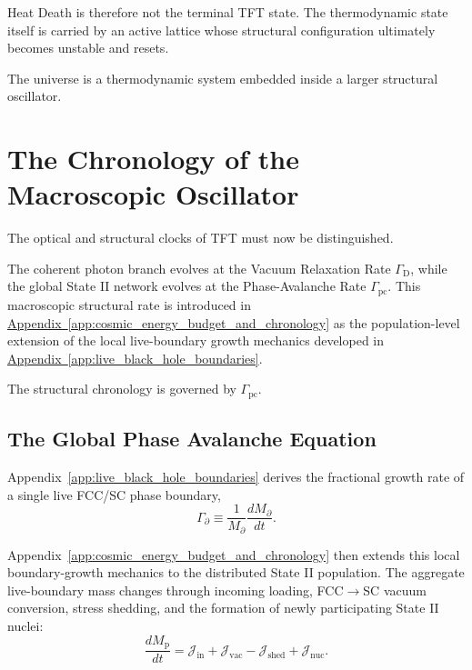 Heat Death is therefore not the terminal TFT state. The thermodynamic state itself is carried by an active lattice whose structural configuration ultimately becomes unstable and resets.

The universe is a thermodynamic system embedded inside a larger structural oscillator.

\section{The Chronology of the Macroscopic Oscillator}
\label{sec:chronology_oscillator}

The optical and structural clocks of TFT must now be distinguished.

The coherent photon branch evolves at the Vacuum Relaxation Rate $\Gamma_{\mathrm D}$, while the global State II network evolves at the Phase-Avalanche Rate $\Gamma_{\mathrm{pc}}$. This macroscopic structural rate is introduced in
\hyperref[app:cosmic_energy_budget_and_chronology]{Appendix~\ref*{app:cosmic_energy_budget_and_chronology}}
as the population-level extension of the local live-boundary growth mechanics developed in
\hyperref[app:live_black_hole_boundaries]{Appendix~\ref*{app:live_black_hole_boundaries}}.

The structural chronology is governed by $\Gamma_{\mathrm{pc}}$.

\subsection{The Global Phase Avalanche Equation}
\label{sec:phase_avalanche_equation}

Appendix~\ref{app:live_black_hole_boundaries} derives the fractional growth rate of a single live FCC/SC phase boundary,
\begin{equation}
    \Gamma_{\partial}
    \equiv
    \frac{1}{M_{\partial}}
    \frac{dM_{\partial}}{dt}.
\end{equation}

Appendix~\ref{app:cosmic_energy_budget_and_chronology} then extends this local boundary-growth mechanics to the distributed State II population. The aggregate live-boundary mass changes through incoming loading, FCC$\rightarrow$SC vacuum conversion, stress shedding, and the formation of newly participating State II nuclei:
\begin{equation}
    \frac{dM_{\mathrm p}}{dt}
    =
    \mathcal J_{\mathrm{in}}
    +
    \mathcal J_{\mathrm{vac}}
    -
    \mathcal J_{\mathrm{shed}}
    +
    \mathcal J_{\mathrm{nuc}}.
\end{equation}

